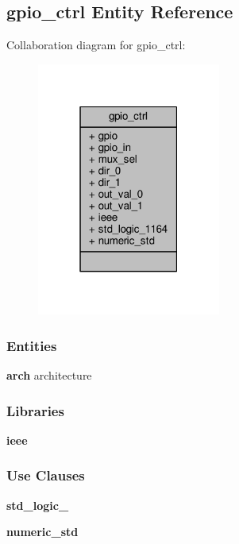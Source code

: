 \subsection{gpio\+\_\+ctrl Entity Reference}
\label{classgpio__ctrl}


Collaboration diagram for gpio\+\_\+ctrl\+:\nopagebreak
\begin{figure}[H]
\begin{center}
\leavevmode
\includegraphics[width=171pt]{d5/de5/classgpio__ctrl__coll__graph}
\end{center}
\end{figure}
\subsubsection*{Entities}
\begin{DoxyCompactItemize}
\item 
{\bf arch} architecture
\end{DoxyCompactItemize}
\subsubsection*{Libraries}
 \begin{DoxyCompactItemize}
\item 
{\bf ieee} 
\end{DoxyCompactItemize}
\subsubsection*{Use Clauses}
 \begin{DoxyCompactItemize}
\item 
{\bf std\+\_\+logic\+\_}   
\item 
{\bf numeric\+\_\+std}   
\end{DoxyCompactItemize}
